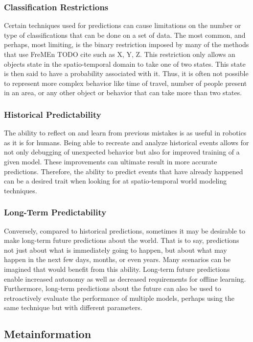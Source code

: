   \subsubsection{ Classification Restrictions }
  Certain techniques used for predictions can cause limitations on the number
  or type of classifications that can be done on a set of data. The most common,
  and perhaps, most limiting, is the binary restriction imposed by many of the
  methods that use FreMEn TODO cite such as X, Y, Z. This restriction only
  allows an objects state in the spatio-temporal domain to take one of two
  states. This state is then said to have a probability associated with it.
  Thus, it is often not possible to represent more complex behavior like time
  of travel, number of people present in an area, or any other object or behavior
  that can take more than two states.

  \subsubsection{ Historical Predictability }
  The ability to reflect on and learn from previous mistakes is as useful in
  robotics as it is for humans. Being able to recreate and analyze historical
  events allows for not only debugging of unexpected behavior but also for
  improved training of a given model. These improvements can ultimate result
  in more accurate predictions. Therefore, the ability to predict events that
  have already happened can be a desired trait when looking for at
  spatio-temporal world modeling techniques.

  \subsubsection{ Long-Term Predictability }
  Conversely, compared to historical predictions, sometimes it may be desirable
  to make long-term future predictions about the world. That is to say, predictions
  not just about what is immediately going to happen, but about what may happen
  in the next few days, months, or even years. Many scenarios can be imagined
  that would benefit from this ability. Long-term future predictions enable
  increased autonomy as well as decreased requirements for offline learning.
  Furthermore, long-term predictions about the future can also be used to
  retroactively evaluate the performance of multiple models, perhaps using
  the same technique but with different parameters.


  \subsection{ Metainformation }

